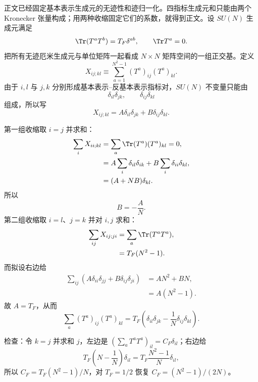 \begin{derivation}



正文已经固定基本表示生成元的无迹性和迹归一化。四指标生成元和只能由两个 Kronecker 张量构成；用两种收缩固定它们的系数，就得到正文。设 $SU(N)$ 生成元满足
\begin{equation*}
 \Tr(T^aT^b)=T_F\delta^{ab},
 \qquad \Tr T^a=0.
\end{equation*}
把所有无迹厄米生成元与单位矩阵一起看成 $N\times N$ 矩阵空间的一组正交基。定义
\begin{equation*}
 X_{ij;kl}\equiv\sum_{a=1}^{N^2-1}(T^a)_{ij}(T^a)_{kl}.
\end{equation*}
由于 $i,l$ 与 $j,k$ 分别形成基本表示--反基本表示指标对，$SU(N)$ 不变量只能由
\begin{equation*}
 \delta_{il}\delta_{jk},
 \qquad
 \delta_{ij}\delta_{kl}
\end{equation*}
组成，所以写
\begin{equation*}
 X_{ij;kl}=A\delta_{il}\delta_{jk}+B\delta_{ij}\delta_{kl}.
\end{equation*}

第一组收缩取 $i=j$ 并求和：
\begin{align*}
 \sum_iX_{ii;kl}
 &=\sum_a\Tr(T^a)(T^a)_{kl}=0,\\
 &=A\sum_i\delta_{il}\delta_{ik}
 +B\sum_i\delta_{ii}\delta_{kl},\\
 &=(A+NB)\delta_{kl}.
\end{align*}
所以
\begin{equation*}
 B=-\frac AN.
\end{equation*}
第二组收缩取 $i=l$、$j=k$ 并对 $i,j$ 求和：
\begin{align*}
 \sum_{ij}X_{ij;ji}
 &=\sum_a\Tr(T^aT^a),\\
 &=T_F(N^2-1).
\end{align*}
而拟设右边给
\begin{align*}
 \sum_{ij}
 \left(A\delta_{ii}\delta_{jj}+B\delta_{ij}\delta_{ji}\right)
 &=AN^2+BN,\\
 &=A(N^2-1).
\end{align*}
故 $A=T_F$，从而
\begin{equation*}
 {
 \sum_a(T^a)_{ij}(T^a)_{kl}
 =T_F\left(
 \delta_{il}\delta_{jk}
 -\frac1N\delta_{ij}\delta_{kl}
 \right).}
\end{equation*}

检查：令 $k=j$ 并求和 $j$，左边是 $(\sum_aT^aT^a)_{il}=C_F\delta_{il}$；右边给
\begin{equation*}
 T_F\left(N-\frac1N\right)\delta_{il}
 =T_F\frac{N^2-1}{N}\delta_{il},
\end{equation*}
所以 $C_F=T_F(N^2-1)/N$，对 $T_F=1/2$ 恢复 $C_F=(N^2-1)/(2N)$。
\end{derivation}

